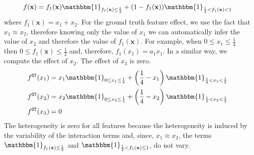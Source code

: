 \documentclass{article} %
\newcommand{\xb}{\mathbf{x}}
\begin{document}
\begin{equation}
  \label{eq:case-a}
  f(\mathbf{x}) = f_1(\xb) \mathbbm{1}_{f_1(\xb) \leq \frac{1}{2}} + (1 - f_1(\xb)) \mathbbm{1}_{\frac{1}{2} < f_1(\xb) < 1}
\end{equation}
%
where $f_1(\xb) = x_1 + x_2$.
For the ground truth feature effect, we use the fact that $x_1 \approx x_2$,
therefore knowing only the value of $x_1$ we can automatically infer the value of $x_2$
and therefore the value of $f_1(\xb)$.
For example, when $0 \leq x_1 \leq \frac{1}{4}$ then $0 \leq f_1(\xb) \leq \frac{1}{2}$ and,
therefore, $f_1(x_1) = a_1 x_1$.
In a similar way, we compute the effect of $x_2$.
The effect of $x_3$ is zero.
%
\begin{align}
    \label{eq:case-a-feat-1}
    f^{\mathtt{GT}}(x_1) &= x_1 \mathbbm{1}_{0 \leq x_1 \leq \frac{1}{4}} + \left ( \frac{1}{4} - x_1 \right ) \mathbbm{1}_{\frac{1}{4} < x_1 < \frac{1}{2}} \\
    f^{\mathtt{GT}}(x_2) &= x_2 \mathbbm{1}_{0 \leq x_2 \leq \frac{1}{4}} + \left ( \frac{1}{4} - x_2 \right ) \mathbbm{1}_{\frac{1}{4} < x_2 < \frac{1}{2}} \\
    f^{\mathtt{GT}}(x_3) &= 0
\end{align}
%
The heterogeneity is zero for all features because the heterogeneity is induced by the variability
of the interaction terms and, since, $x_1 \approx x_2$, the terms
$\mathbbm{1}_{f_1(\xb) \leq \frac{1}{2}}$ and $\mathbbm{1}_{\frac{1}{2} < f_1(\xb) \leq 1}$, do not vary.
%
\end{document}

